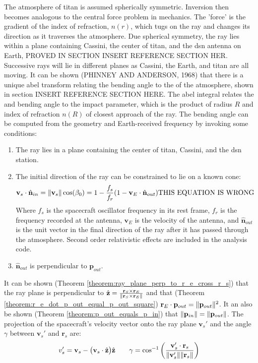 \documentclass[oneside]{book}
\theoremstyle{mystyle}
\DeclarePairedDelimiter\norm{\lVert}{\rVert}
\begin{document}
The atmosphere of \gls{titan} is assumed spherically symmetric. Inversion then becomes analogous to the central force problem in mechanics. The 'force' is the gradient of the \gls{index of refraction}, $n(r)$, which tugs on the ray and changes its direction as it traverses the atmosphere. Due spherical symmetry, the ray lies within a plane containing Cassini, the center of \gls{titan}, and the \gls{dsn} antenna on Earth, PROVED IN SECTION INSERT REFERENCE SECTION HER. Successive rays will lie in different planes as Cassini, the Earth, and \gls{titan} are all moving. It can be shown (PHINNEY AND ANDERSON, 1968) that there is a unique \gls{abel transform} relating the bending angle to the  of the atmosphere, shown in section INSERT REFERENCE SECTION HERE. The \gls{abel integral} relates the  and \gls{bending angle} to the \gls{impact parameter}, which is the product of radius $R$ and index of refraction $n(R)$ of closest approach of the ray. The \gls{bending angle} can be computed from the geometry and Earth-received \gls{frequency} by invoking some conditions:

\begin{enumerate}[itemsep=0pt]
\item The ray lies in a plane containing the center of \gls{titan}, Cassini, and the \gls{dsn} station. 
\item The initial direction of the ray can be constrained to lie on a known cone:
\begin{equation}
\mathbf{v}_{s}\cdot \hat{\mathbf{n}}_{in} = \norm{\mathbf{v}_{s}}\cos(\beta_0) = 1-\frac{f_s}{f_r}(1-\mathbf{v}_{E}\cdot \hat{\mathbf{n}}_{out})\textrm{THIS EQUATION IS WRONG}
\end{equation}
Where $f_s$ is the spacecraft oscillator frequency in its rest frame, $f_r$ is the frequency recorded at the antenna, $\mathbf{v}_{E}$ is the velocity of the antenna, and $\hat{\mathbf{n}}_{out}$ is the unit vector in the final direction of the ray after it has passed through the atmosphere. Second order relativistic effects are included in the analysis code.
\item $\hat{\mathbf{n}}_{out}$ is perpendicular to $\mathbf{p}_{out}$.
\end{enumerate}

It can be shown (Theorem \ref{theorem:ray_plane_perp_to_r_e_cross_r_s}) that the ray plane is perpendicular to $\hat{\mathbf{z}} = \frac{\mathbf{r}_{S}\times \mathbf{r}_{E}}{\norm{\mathbf{r}_{S}\times \mathbf{r}_{E}}}$ and that (Theorem \ref{theorem:r_e_dot_p_out_equal_p_out_square}) $\mathbf{r}_{E}\cdot \mathbf{p}_{out} = \norm{\mathbf{p}_{out}}^2$. It an also be shown (Theorem \ref{theorem:p_out_equals_p_in}) that $\norm{\mathbf{p}_{in}}=\norm{\mathbf{p}_{out}}$. The projection of the spacecraft's velocity vector onto the ray plane $\mathbf{v}_{s}'$ and the angle $\gamma$ between $\mathbf{v}_{s}'$ and $\mathbf{r}_{s}$ are:
\begin{equation}
v_{s}' = \mathbf{v}_{s} - \big(\mathbf{v}_{s}\cdot \hat{\mathbf{z}}\big) \hat{\mathbf{z}}\quad \quad \gamma = \cos^{-1}\bigg(\frac{\mathbf{v}_{s}'\cdot \mathbf{r}_{s}}{\norm{\mathbf{v}_{s}'} \norm{\mathbf{r}_{s}}}\bigg)
\end{equation}
\end{document}
